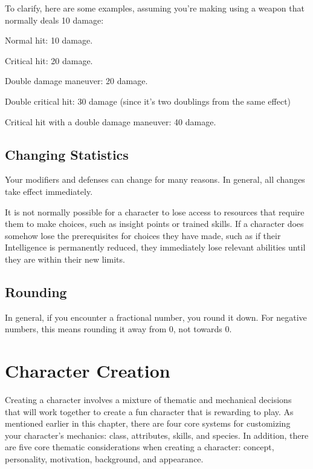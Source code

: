     To clarify, here are some examples, assuming you're making using a weapon that normally deals 10 damage:
    \begin{raggeditemize}
      \item Normal hit: 10 damage.
      \item Critical hit: 20 damage.
      \item Double damage maneuver: 20 damage.
      \item Double critical hit: 30 damage (since it's two doublings from the same effect)
      \item Critical hit with a double damage maneuver: 40 damage.
    \end{raggeditemize}

  \subsection{Changing Statistics}

    Your modifiers and defenses can change for many reasons.
    In general, all changes take effect immediately.

    It is not normally possible for a character to lose access to resources that require them to make choices, such as insight points or trained skills.
    If a character does somehow lose the prerequisites for choices they have made, such as if their Intelligence is permanently reduced, they immediately lose relevant abilities until they are within their new limits.

  \subsection{Rounding}
    In general, if you encounter a fractional number, you round it down.
    For negative numbers, this means rounding it away from 0, not towards 0.

\section{Character Creation}\label{Character Creation}

  Creating a character involves a mixture of thematic and mechanical decisions that will work together to create a fun character that is rewarding to play.
  As mentioned earlier in this chapter, there are four core systems for customizing your character's mechanics: class, attributes, skills, and species.
  In addition, there are five core thematic considerations when creating a character: concept, personality, motivation, background, and appearance.

